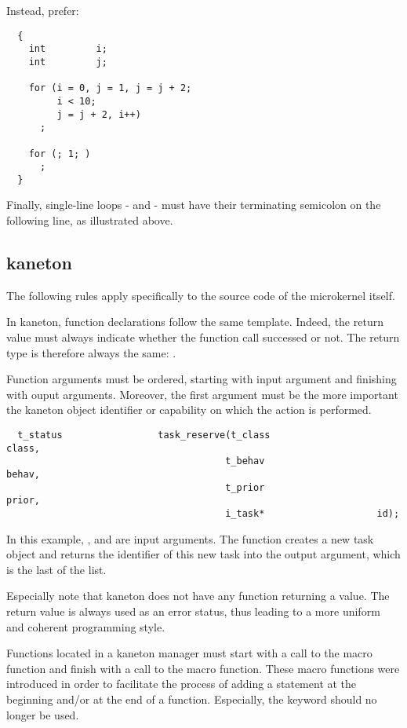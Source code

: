 Instead, prefer:

\begin{verbatim}
  {
    int         i;
    int         j;

    for (i = 0, j = 1, j = j + 2;
         i < 10;
         j = j + 2, i++)
      ;

    for (; 1; )
      ;
  }
\end{verbatim}

Finally, single-line loops -  and  - must have
their terminating semicolon on the following line, as illustrated above.

%
%

\subsection{kaneton}

The following rules apply specifically to the source code of the microkernel
itself.

In kaneton, function declarations follow the same template. Indeed, the
return value must always indicate whether the function call successed or not.
The return type is therefore always the same: .

Function arguments must be ordered, starting with input argument and
finishing with ouput arguments. Moreover, the first argument must
be the more important \ie{} the kaneton object identifier or
capability on which the action is performed.

\begin{verbatim}
  t_status                 task_reserve(t_class                    class,
                                       t_behav                    behav,
                                       t_prior                    prior,
                                       i_task*                    id);
\end{verbatim}

In this example, ,  and  are
input arguments. The function creates a new task object and returns the
identifier of this new task into the  output argument, which
is the last of the list.

Especially note that kaneton does not have any function returning a value.
The return value is always used as an error status, thus leading to a more
uniform and coherent programming style.

Functions located in a kaneton manager must start with a call to the
 macro function and finish with a call to the 
macro function. These macro functions were introduced in order to
facilitate the process of adding a statement at the beginning and/or at
the end of a function. Especially, the  keyword should no
longer be used.

